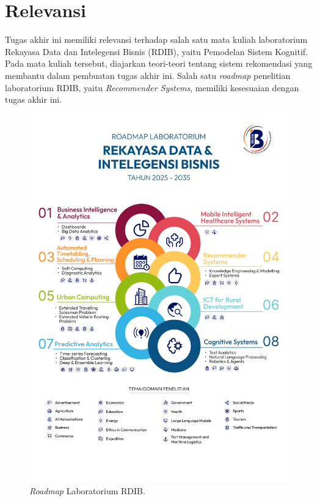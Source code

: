 \section{Relevansi}
\label{sec:Relevansi}

Tugas akhir ini memiliki relevansi terhadap salah satu mata kuliah laboratorium Rekayasa Data dan Intelegensi Bisnis (RDIB), yaitu Pemodelan Sistem Kognitif. 
Pada mata kuliah tersebut, diajarkan teori-teori tentang sistem rekomendasi yang membantu dalam pembuatan tugas akhir ini. 
Salah satu \emph{roadmap} penelitian laboratorium RDIB, yaitu \emph{Recommender Systems}, memiliki kesesuaian dengan tugas akhir ini.

\begin{figure}[H]
  \centering

  \includegraphics[scale=0.1]{gambar/roadmap.png}

  \caption{\emph{Roadmap} Laboratorium RDIB.}
  \label{fig:roadmap}
\end{figure}